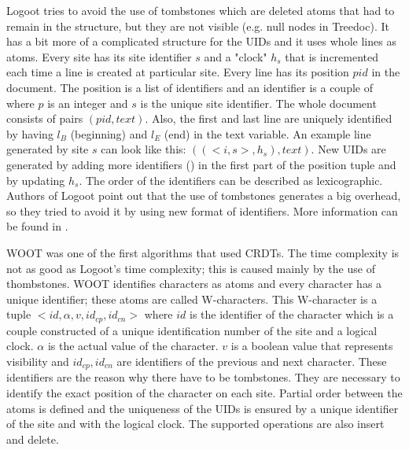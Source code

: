 \documentclass[12pt,oneside]{fithesis2}
\begin{document}
\par Logoot tries to avoid the use of tombstones which are deleted atoms that had to remain in the structure, but they are not visible (e.g. null nodes in Treedoc). It has a bit more of a complicated structure for the UIDs and it uses whole lines as atoms. Every site has its site identifier \(s\) and a "clock" \(h_s\) that is incremented each time a line is created at particular site. Every line has its position \(pid\) in the document. The position is a list of identifiers and an identifier is a couple of \(<p,s>\) where \(p\) is an integer and \(s\) is the unique site identifier. The whole document consists of pairs \((pid,text)\). Also, the first and last line are uniquely identified by having \(l_B\) (beginning) and \(l_E\) (end) in the text variable. An example line generated by site \(s\) can look like this: \( ((<i,s>,h_s),text) \). New UIDs are generated by adding more identifiers (\(<i,s>\)) in the first part of the position tuple and by updating \(h_s\). The order of the identifiers can be described as lexicographic. Authors of Logoot point out that the use of tombstones generates a big overhead, so they tried to avoid it by using new format of identifiers. More information can be found in \cite{Logoot}.
\par WOOT was one of the first algorithms that used CRDTs. The time complexity is not as good as Logoot's time complexity; this is caused mainly by the use of thombstones. WOOT identifies characters as atoms and every character has a unique identifier; these atoms are called W-characters. This W-character is a tuple \( <id,\alpha,v,id_{cp},id_{cn}> \) where \(id\) is the identifier of the character which is a couple constructed of a unique identification number of the site and a logical clock. \(\alpha\) is the actual value of the character. \(v\) is a boolean value that represents visibility and \( id_{cp}, id_{cn} \) are identifiers of the previous and next character. These identifiers are the reason why there have to be tombstones. They are necessary to identify the exact position of the character on each site. Partial order between the atoms is defined and the uniqueness of the UIDs is ensured by a unique identifier of the site and with the logical clock. The supported operations are also insert and delete. 
\end{document}
